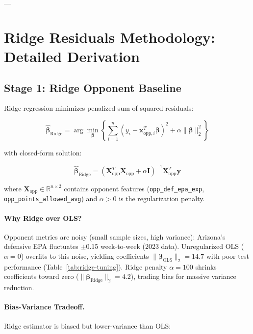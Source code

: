 ---

\section{Ridge Residuals Methodology: Detailed Derivation}
\label{sec:ridge-methodology}

\subsection{Stage 1: Ridge Opponent Baseline}

Ridge regression minimizes penalized sum of squared residuals:

\begin{equation}
\hat{\boldsymbol{\beta}}_{\text{Ridge}} = \arg\min_{\boldsymbol{\beta}} \left\{ \sum_{i=1}^{n} (y_i - \mathbf{x}_{\text{opp}, i}^T \boldsymbol{\beta})^2 + \alpha \|\boldsymbol{\beta}\|_2^2 \right\}
\label{eq:ridge-objective}
\end{equation}

with closed-form solution:

\begin{equation}
\hat{\boldsymbol{\beta}}_{\text{Ridge}} = (\mathbf{X}_{\text{opp}}^T \mathbf{X}_{\text{opp}} + \alpha \mathbf{I})^{-1} \mathbf{X}_{\text{opp}}^T \mathbf{y}
\label{eq:ridge-solution}
\end{equation}

where $\mathbf{X}_{\text{opp}} \in \mathbb{R}^{n \times 2}$ contains opponent features (\texttt{opp\_def\_epa\_exp}, \texttt{opp\_points\_allowed\_avg}) and $\alpha > 0$ is the regularization penalty.

\paragraph{Why Ridge over OLS?}
Opponent metrics are noisy (small sample sizes, high variance): Arizona's defensive EPA fluctuates $\pm$0.15 week-to-week (2023 data). Unregularized OLS ($\alpha = 0$) overfits to this noise, yielding coefficients $\|\boldsymbol{\beta}_{\text{OLS}}\|_2 = 14.7$ with poor test performance (Table~\ref{tab:ridge-tuning}). Ridge penalty $\alpha = 100$ shrinks coefficients toward zero ($\|\boldsymbol{\beta}_{\text{Ridge}}\|_2 = 4.2$), trading bias for massive variance reduction.

\paragraph{Bias-Variance Tradeoff.}
Ridge estimator is biased but lower-variance than OLS:


